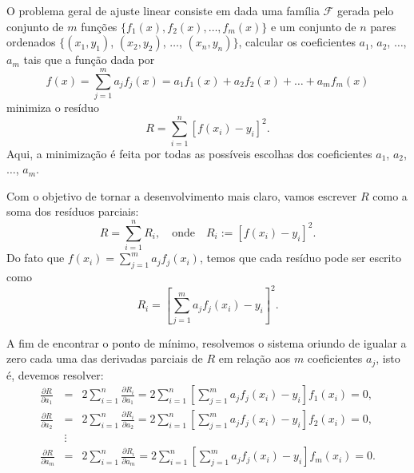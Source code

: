 O problema geral de ajuste linear consiste em dada uma família $\mathcal{F}$ gerada pelo conjunto de $m$ funções $\{f_1(x), f_2(x), \dotsc, f_m(x)\}$ e um conjunto de $n$ pares ordenados $\{(x_1, y_1)$, $(x_2, y_2)$, $\ldots$, $(x_n, y_n)\}$, calcular os coeficientes $a_1$, $a_2$, $\ldots$, $a_m$ tais que a função dada por
\begin{equation}
  f(x) = \sum_{j=1}^m a_jf_j(x) = a_1f_1(x)+a_2f_2(x)+\ldots+a_mf_m(x)
\end{equation}
minimiza o resíduo
\begin{equation}
  R= \sum_{i=1}^n \left[f(x_i)-y_i\right]^2.
\end{equation}
Aqui, a minimização é feita por todas as possíveis escolhas dos coeficientes $a_1$, $a_2$, $\ldots$, $a_m$.

Com o objetivo de tornar a desenvolvimento mais claro, vamos escrever $R$ como a soma dos resíduos parciais:
\begin{equation}
  R= \sum_{i=1}^n R_i,\quad \text{onde} \quad R_i := \left[f(x_i)-y_i\right]^2.
\end{equation}
Do fato que $f(x_i)=\sum_{j=1}^m a_jf_j(x_i)$, temos que cada resíduo pode ser escrito como
\begin{equation}
  R_i=  \left[\sum_{j=1}^m a_jf_j(x_i)-y_i\right]^2.
\end{equation}

A fim de encontrar o ponto de mínimo, resolvemos o sistema oriundo de igualar a zero cada uma das derivadas parciais de $R$ em relação aos $m$ coeficientes $a_j$, isto é, devemos resolver:
\begin{eqnarray*}
\frac{\partial R}{\partial a_1} &=& 2 \sum_{i=1}^n \frac{\partial R_i}{\partial a_1} = 2\sum_{i=1}^n \left[\sum_{j=1}^m a_jf_j(x_i)-y_i\right] f_1(x_i)=0,\\
\frac{\partial R}{\partial a_2} &=& 2 \sum_{i=1}^n \frac{\partial R_i}{\partial a_2}=2\sum_{i=1}^n \left[\sum_{j=1}^m a_jf_j(x_i)-y_i\right] f_2(x_i)=0,\\
&\vdots&\\
\frac{\partial R}{\partial a_m} &=& 2 \sum_{i=1}^n \frac{\partial R_i}{\partial a_m}= 2\sum_{i=1}^n \left[\sum_{j=1}^m a_jf_j(x_i)-y_i\right] f_m(x_i)=0.
\end{eqnarray*}

